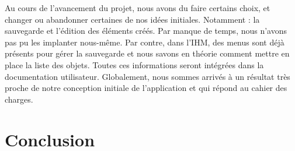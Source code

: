 \documentclass[a4paper,11pt]{article}
\begin{document}
		Au cours de l'avancement du projet, nous avons du faire certains choix, et changer ou abandonner certaines de nos idées initiales. Notamment : la sauvegarde et l'édition des éléments créés.
		Par manque de temps, nous n'avons pas pu les implanter nous-même. Par contre, dans l'IHM, des menus sont déjà présents pour gérer la sauvegarde et nous savons en théorie comment mettre en place la liste des objets. Toutes ces informations seront intégrées dans la documentation utilisateur.
		Globalement, nous sommes arrivés à un résultat très proche de notre conception initiale de l'application et qui répond au cahier des charges.
	
	\section{Conclusion} %
			
\end{document}
